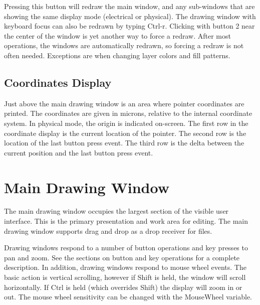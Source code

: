 Pressing this button will redraw the main window, and any sub-windows
that are showing the same display mode (electrical or physical).  The
drawing window with keyboard focus can also be redrawn by typing {\kb
Ctrl-r}.  Clicking with button 2 near the center of the window is yet
another way to force a redraw.  After most operations, the windows are
automatically redrawn, so forcing a redraw is not often needed. 
Exceptions are when changing layer colors and fill patterns.


\subsection{Coordinates Display}

Just above the {\Xic} main drawing window is an area where
pointer coordinates are printed.  The coordinates are given in
microns, relative to the internal coordinate system.  In physical
mode, the origin is indicated on-screen.  The first row in the
coordinate display is the current location of the pointer.  The second
row is the location of the last button press event.  The third row is
the delta between the current position and the last button press
event.


\section{Main Drawing Window}
The main drawing window occupies the largest section of the visible
user interface.  This is the primary presentation and work area for
editing.  The main drawing window supports drag and drop as a drop
receiver for files.

Drawing windows respond to a number of button operations and key
presses to pan and zoom.  See the sections on button and key
operations for a complete description.  In addition, drawing windows
respond to mouse wheel events.  The basic action is vertical
scrolling, however if {\kb Shift} is held, the window will scroll
horizontally.  If {\kb Ctrl} is held (which overrides {\kb Shift})
the display will zoom in or out.  The mouse wheel sensitivity can be
changed with the {\et MouseWheel} variable.


